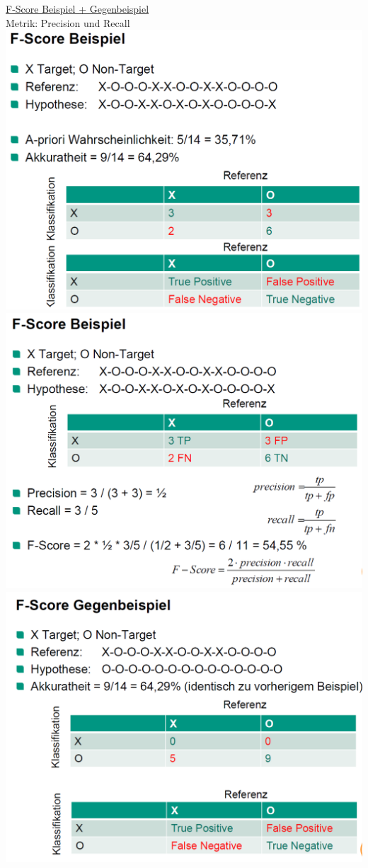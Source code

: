 \documentclass[a4paper,10pt,oneside]{article}
\begin{document}
\underline{F-Score Beispiel + Gegenbeispiel} \\
 Metrik: Precision und Recall \\
 \includegraphics[scale=0.2]{Grafiken/2411.png}
 \includegraphics[scale=0.2]{Grafiken/2412.png}
 \includegraphics[scale=0.2]{Grafiken/2413.png}
\end{document}
